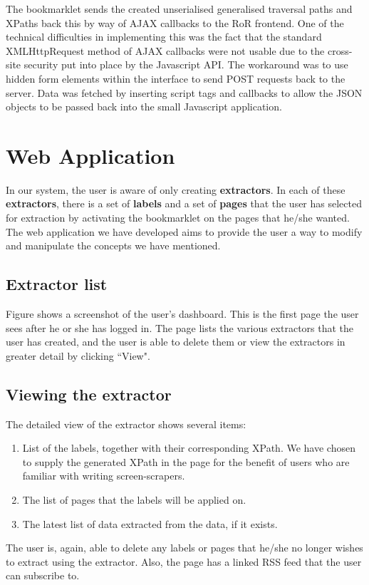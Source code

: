 The bookmarklet sends the created unserialised generalised traversal paths and XPaths back this
by way of AJAX callbacks to the RoR frontend. One of the technical difficulties in implementing
this was the fact that the standard XMLHttpRequest method of AJAX callbacks were not usable due
to the cross-site security put into place by the Javascript API. The workaround was to use
hidden form elements within the interface to send POST requests back to the server. Data was
fetched by inserting script tags and callbacks to allow the JSON objects to be passed back into
the small Javascript application.

\section{Web Application}
 In our system, the user is aware of only creating \textbf{extractors}. In each of these
 \textbf{extractors}, there is a set of \textbf{labels} and a set of \textbf{pages} that the
 user has selected for extraction by activating the bookmarklet on the pages that he/she
 wanted. The web application we have developed aims to provide the user a way to modify and
 manipulate the concepts we have mentioned.
 
 \subsection{Extractor list}
 
 Figure %
 shows a screenshot of the user's dashboard. This is the first page the user sees after he or
 she has logged in. The page lists the various extractors that the user has created, and the 
 user is able to delete them or view the extractors in greater detail by clicking ``View".
 
 \subsection{Viewing the extractor}
 The detailed view of the extractor shows several items:
 \begin{enumerate}
 	\item List of the labels, together with their corresponding XPath.
 	We have chosen to supply the generated XPath in the page for the benefit
	of users who are familiar with writing screen-scrapers.
 	\item The list of pages that the labels will be applied on.
 	\item The latest list of data extracted from the data, if it exists.
 \end{enumerate}
 The user is, again, able to delete any labels or pages that he/she no longer wishes to extract
 using the extractor. Also, the page has a linked RSS feed that the user can subscribe to.
 
